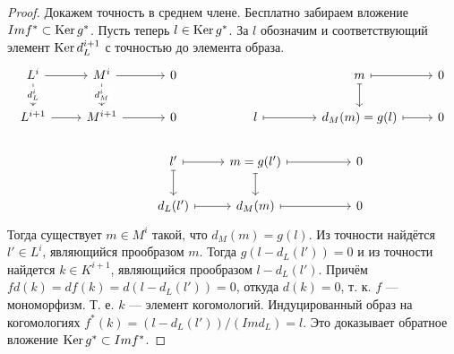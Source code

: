\documentclass[../main.tex]{subfiles}
\begin{document}
\begin{proof}
  Докажем точность в среднем члене. Бесплатно забираем вложение $Im f^* \subset \mathop{\mathrm{Ker}}\nolimits g^*$. Пусть теперь $l \in \mathop{\mathrm{Ker}}\nolimits g^*$. За $l$ обозначим и соответствующий элемент $\mathop{\mathrm{Ker}}\nolimits d^{i+1}_L$ с точностью до элемента образа.
  \begin{equation}
    \begin{tikzcd}
	{L^i} & {M^i} & 0 && m & 0 \\
	{L^{i+1}} & {M^{i+1}} & 0 & l & {d_M(m) = g(l)} & 0 \\
	&& {l'} & {m = g(l')} & 0 \\
	&& {d_L(l')} & {d_M(m)} & 0
	\arrow[from=1-2, to=1-3]
	\arrow[from=1-1, to=1-2]
	\arrow[from=2-1, to=2-2]
	\arrow[from=2-2, to=2-3]
	\arrow["{d_M^i}"{description}, from=1-2, to=2-2]
	\arrow["{d_L^i}"{description}, from=1-1, to=2-1]
	\arrow[maps to, from=2-4, to=2-5]
	\arrow[maps to, from=2-5, to=2-6]
	\arrow[maps to, from=1-5, to=1-6]
	\arrow[maps to, from=1-5, to=2-5]
	\arrow[maps to, from=3-3, to=4-3]
	\arrow[maps to, from=4-3, to=4-4]
	\arrow[maps to, from=3-4, to=4-4]
	\arrow[maps to, from=3-3, to=3-4]
	\arrow[maps to, from=3-4, to=3-5]
	\arrow[maps to, from=4-4, to=4-5]
\end{tikzcd}
\end{equation}
Тогда существует $m\in M^{i}$ такой, что $d_M(m) = g(l)$. Из точности найдётся $l'\in L^i$, являющийся прообразом $m$. Тогда $g(l - d_L(l')) = 0$ и из точности найдется $k\in K^{i+1}$, являющийся прообразом $l - d_L(l')$. Причём $fd(k) = df(k) = d(l - d_L(l')) = 0$, откуда $d(k) = 0$, т. к. $f$ --- мономорфизм. Т. е. $k$ --- элемент когомологий. Индуцированный образ на когомологиях $f^*(k) = (l - d_L(l'))/(Im d_L) = l$. Это доказывает обратное вложение $\mathop{\mathrm{Ker}}\nolimits g^* \subset Im f^*$.


\end{proof}
\end{document}
